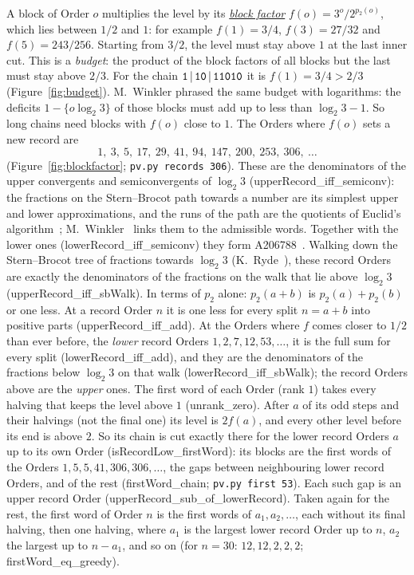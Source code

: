 \documentclass[11pt,a4paper,titlepage]{article}
\makeatletter
\newcommand{\termhere}[1]{\leavevmode
  \Hy@raisedlink{\hyper@anchorstart{term:#1}\hyper@anchorend}}
\newcommand{\keyterm}[2]{\hyperlink{box:#1}{\emph{#2}}}
\newcommand{\lean}[1]{\textsf{#1}}
\newcommand{\pv}[1]{\texttt{pv.py #1}}
\makeatother
\begin{document}
\termhere{blockfactor}A block of Order $o$ multiplies the level by its \keyterm{blockfactor}{block factor}
$f(o) = 3^{o}/2^{p_2(o)}$, which
lies between $1/2$ and $1$: for example $f(1) = 3/4$, $f(3) = 27/32$ and
$f(5) = 243/256$. Starting from $3/2$, the level must stay above $1$ at the last
inner cut. This is a \emph{budget}: the product of the block factors of all blocks
but the last must stay above $2/3$. For the chain $\text{\texttt{1}}\,|\,\text{\texttt{10}}\,|\,\text{\texttt{11010}}$ it is
$f(1) = 3/4 > 2/3$ (Figure~\ref{fig:budget}). M.~Winkler phrased the same budget with logarithms: the
deficits $1 - \{o \log_2 3\}$ of those blocks must add up to less than
$\log_2 3 - 1$. So long chains need blocks with $f(o)$ close to $1$. The Orders where
$f(o)$ sets a new record are
\[
1,\ 3,\ 5,\ 17,\ 29,\ 41,\ 94,\ 147,\ 200,\ 253,\ 306,\ \dots
\]
(Figure~\ref{fig:blockfactor}; \pv{records 306}).
These are the denominators of the upper convergents and semiconvergents of
$\log_2 3$ (\lean{upperRecord\_iff\_semiconv}): the fractions on the Stern--Brocot path towards a number are its simplest
upper and lower approximations, and the runs of the path are the quotients of Euclid's
algorithm~\cite[\S4.5, pp.~122--123]{GKP1989}; M.~Winkler~\cite{Winkler2026b} links them
to the admissible words. Together with the lower ones (\lean{lowerRecord\_iff\_semiconv}) they
form A206788~\cite{OEIS_A206788}. Walking down the Stern--Brocot tree of
fractions towards $\log_2 3$ (K.~Ryde~\cite{Ryde2020}), these record Orders are
exactly the denominators of the fractions on the walk that lie above
$\log_2 3$ (\lean{upperRecord\_iff\_sbWalk}). In terms of $p_2$ alone: $p_2(a + b)$ is
$p_2(a) + p_2(b)$ or one less. At
a record Order $n$ it is one less for every split $n = a + b$ into positive parts
(\lean{upperRecord\_iff\_add}). At the Orders where $f$ comes closer to $1/2$ than ever
before, the \emph{lower} record Orders $1, 2, 7, 12, 53, \dots$, it is the full sum for
every split (\lean{lowerRecord\_iff\_add}), and they are the denominators of the fractions
below $\log_2 3$ on that walk (\lean{lowerRecord\_iff\_sbWalk}); the record Orders above are the
\emph{upper} ones. The first word of each Order (rank $1$) takes every halving that
keeps the level above $1$ (\lean{unrank\_zero}). After $a$ of its odd steps and their
halvings (not the final one) its level is $2 f(a)$, and every other level before its end is
above $2$. So its chain is cut exactly there for the lower record Orders $a$ up to its
own Order (\lean{isRecordLow\_firstWord}): its blocks are the first words of the Orders
$1, 5, 5, 41, 306, 306, \dots$, the gaps between neighbouring lower record Orders, and
of the rest (\lean{firstWord\_chain}; \pv{first 53}). Each such gap is an upper record Order
(\lean{upperRecord\_sub\_of\_lowerRecord}). Taken again for the rest, the first word of
Order $n$ is the first words of $a_1, a_2, \dots$, each without its final halving, then one
halving, where $a_1$ is the largest lower record Order up to $n$, $a_2$ the largest up to
$n - a_1$, and so on (for $n = 30$: $12, 12, 2, 2, 2$; \lean{firstWord\_eq\_greedy}).
\end{document}
